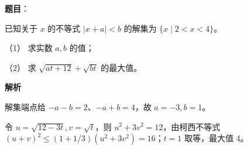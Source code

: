 \begin{answer}

\textbf{题目}：

已知关于 $x$ 的不等式 $|x+a|<b$ 的解集为 $\{x\mid2<x<4\}$。

（1） 求实数 $a,b$ 的值；

（2） 求 $\sqrt{at+12}+\sqrt{bt}$ 的最大值。

\textbf{解析}


解集端点给 $-a-b=2$、$-a+b=4$，故 $a=-3,b=1$。


令 $u=\sqrt{12-3t},v=\sqrt t$，则 $u^2+3v^2=12$，由柯西不等式 $(u+v)^2\le(1+1/3)(u^2+3v^2)=16$；$t=1$ 取等，最大值 4。



\end{answer}